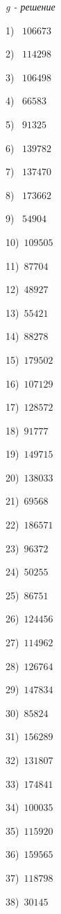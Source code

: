 \documentclass{article}
\begin{document}
 
\begin{center} 
   \large{\textit{g - решение}} 
\end{center}\begin{multicols}{2}
1)$\,\,\,\,\,106673$ \par 
2)$\,\,\,\,\,114298$ \par 
3)$\,\,\,\,\,106498$ \par 
4)$\,\,\,\,\,66583$ \par 
5)$\,\,\,\,\,91325$ \par 
6)$\,\,\,\,\,139782$ \par 
7)$\,\,\,\,\,137470$ \par 
8)$\,\,\,\,\,173662$ \par 
9)$\,\,\,\,\,54904$ \par 
10)$\,\,\,109505$ \par 
11)$\,\,\,87704$ \par 
12)$\,\,\,48927$ \par 
13)$\,\,\,55421$ \par 
14)$\,\,\,88278$ \par 
15)$\,\,\,179502$ \par 
16)$\,\,\,107129$ \par 
17)$\,\,\,128572$ \par 
18)$\,\,\,91777$ \par 
19)$\,\,\,149715$ \par 
20)$\,\,\,138033$ \par 
21)$\,\,\,69568$ \par 
22)$\,\,\,186571$ \par 
23)$\,\,\,96372$ \par 
24)$\,\,\,50255$ \par 
25)$\,\,\,86751$ \par 
26)$\,\,\,124456$ \par 
27)$\,\,\,114962$ \par 
28)$\,\,\,126764$ \par 
29)$\,\,\,147834$ \par 
30)$\,\,\,85824$ \par 
31)$\,\,\,156289$ \par 
32)$\,\,\,131807$ \par 
33)$\,\,\,174841$ \par 
34)$\,\,\,100035$ \par 
35)$\,\,\,115920$ \par 
36)$\,\,\,159565$ \par 
37)$\,\,\,118798$ \par 
38)$\,\,\,30145$ \par 

\end{multicols}
\end{document}
